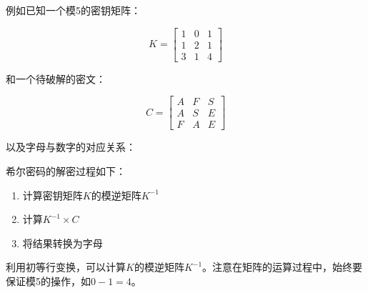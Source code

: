 例如已知一个模5的密钥矩阵：

\[
    K =
    \begin{bmatrix}
        1 & 0 & 1 \\
        1 & 2 & 1 \\
        3 & 1 & 4
    \end{bmatrix}
\]

\vspace{0.5cm}

和一个待破解的密文：

\[
    C =
    \begin{bmatrix}
        A & F & S \\
        A & S & E \\
        F & A & E
    \end{bmatrix}
\]

\vspace{0.5cm}

以及字母与数字的对应关系：

\begin{table}[H]
    \centering
\end{table}

希尔密码的解密过程如下：

\begin{enumerate}
    \item 计算密钥矩阵$ K $的模逆矩阵$ K^{-1} $
    \item 计算$ K^{-1} \times C $
    \item 将结果转换为字母
\end{enumerate}

利用初等行变换，可以计算$ K $的模逆矩阵$ K^{-1} $。注意在矩阵的运算过程中，始终要保证模5的操作，如$ 0 - 1 = 4 $。

